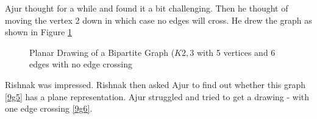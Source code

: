 Ajur thought for a while and found it a bit challenging. Then he thought of moving the vertex 2 down in which case no edges will cross. He drew the graph as shown in Figure \ref{9g4}
\begin{figure}
\begin{center}
\caption{ Planar Drawing of a Bipartite Graph ($K{2,3}$ with 5 vertices and 6 edges with  no edge crossing}\label{9g4}
\end{center}
\end{figure}

Rishnak was impressed. Rishnak then asked Ajur to find out whether this graph \ref{9g5} has a plane representation. Ajur struggled and tried to get a drawing - with one edge crossing \ref{9g6}. 

